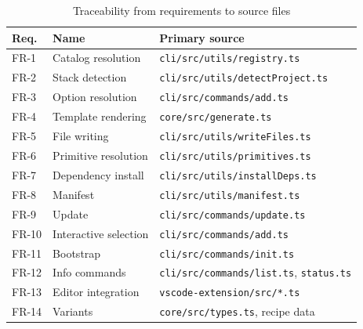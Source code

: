 \begin{longtable}{p{1.6cm}p{5.4cm}p{7.4cm}}
\caption{Traceability from requirements to source files}\\
\toprule
\textbf{Req.} & \textbf{Name} & \textbf{Primary source} \\
\midrule

FR-1 & Catalog resolution & \texttt{cli/src/utils/registry.ts} \\
FR-2 & Stack detection & \texttt{cli/src/utils/detectProject.ts} \\
FR-3 & Option resolution & \texttt{cli/src/commands/add.ts} \\
FR-4 & Template rendering & \texttt{core/src/generate.ts} \\
FR-5 & File writing & \texttt{cli/src/utils/writeFiles.ts} \\
FR-6 & Primitive resolution & \texttt{cli/src/utils/primitives.ts} \\
FR-7 & Dependency install & \texttt{cli/src/utils/installDeps.ts} \\
FR-8 & Manifest & \texttt{cli/src/utils/manifest.ts} \\
FR-9 & Update & \texttt{cli/src/commands/update.ts} \\
FR-10 & Interactive selection & \texttt{cli/src/commands/add.ts} \\
FR-11 & Bootstrap & \texttt{cli/src/commands/init.ts} \\
FR-12 & Info commands & \texttt{cli/src/commands/list.ts}, \texttt{status.ts} \\
FR-13 & Editor integration & \texttt{vscode-extension/src/*.ts} \\
FR-14 & Variants & \texttt{core/src/types.ts}, recipe data \\
\bottomrule
\end{longtable}
